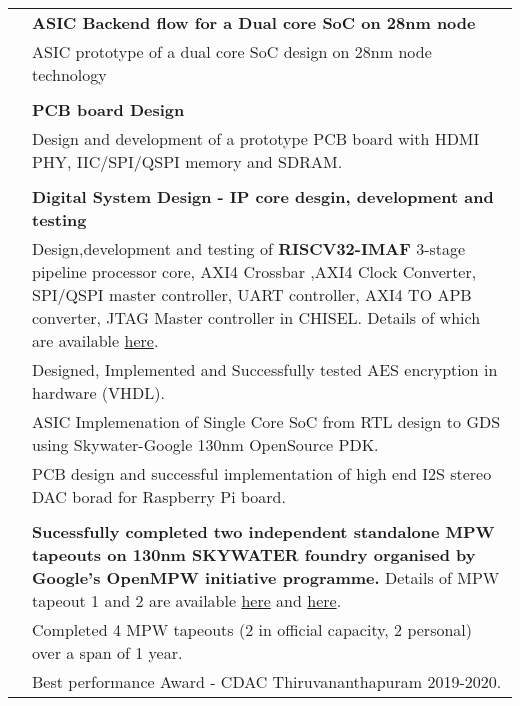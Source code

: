\documentclass[letterpaper, 11pt]{article}
\begin{document}
\begin{longtable}{p{1.3in}p{4.8in}}
& \textbf{ASIC Backend flow for a Dual core SoC on 28nm node} \\
& ASIC prototype of a dual core SoC design on 28nm node technology\\
& \\

& \textbf{PCB board Design} \\
& Design and development of a prototype PCB board with HDMI PHY, IIC/SPI/QSPI memory and SDRAM.\\
& \\


\nohyphens{\color{OliveGreen}{Other Experience}} 
& \textbf{Digital System Design - IP core desgin, development and testing} \\
& Design,development and testing of \textbf{RISCV32-IMAF} 3-stage pipeline processor core, AXI4 Crossbar ,AXI4 Clock Converter, SPI/QSPI master controller,  UART controller, AXI4 TO APB converter, JTAG Master controller in CHISEL.  Details of which are available \href{https://github.com/siva12a/ipcores}{here}.\\
& Designed, Implemented and Successfully tested AES encryption in hardware (VHDL). \\
& ASIC Implemenation of Single Core SoC from RTL design to GDS using Skywater-Google 130nm OpenSource PDK.  \\
& PCB design and successful implementation of high end I2S stereo DAC borad for Raspberry Pi board. \\
& \\
& \textbf{Sucessfully completed two independent standalone MPW tapeouts on 130nm SKYWATER foundry organised by Google's OpenMPW initiative programme. } Details of MPW tapeout 1 and 2 are available  \href{https://github.com/siva12a/soc_io_expander}{here} and \href{https://github.com/siva12a/caravel_peripheral_extender}{here}.\\





\nohyphens{\color{OliveGreen}{Achievements}} 
& Completed 4 MPW tapeouts (2 in official capacity, 2 personal) over a span of 1 year. \\
& Best performance Award - CDAC Thiruvananthapuram 2019-2020. \\
 














\end{longtable}
\end{document}
